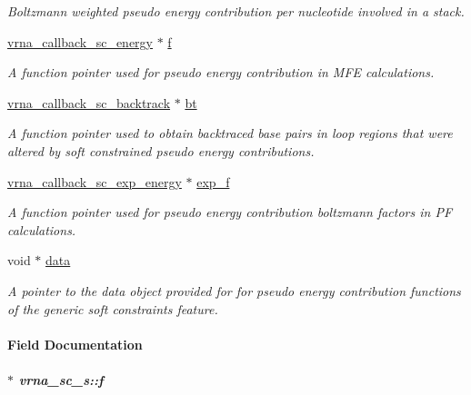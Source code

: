 \begin{DoxyCompactItemize}
\begin{DoxyCompactList}\small\item\em Boltzmann weighted pseudo energy contribution per nucleotide involved in a stack. \end{DoxyCompactList}\item 
\hyperlink{group__soft__constraints_gaf38062858ac25fd5e240c2c3b0b0b780}{vrna\+\_\+callback\+\_\+sc\+\_\+energy} $\ast$ \hyperlink{group__soft__constraints_a32dc86090237888c75491bbd4861a04b}{f}
\begin{DoxyCompactList}\small\item\em A function pointer used for pseudo energy contribution in M\+F\+E calculations. \end{DoxyCompactList}\item 
\hyperlink{group__soft__constraints_gaa216f513c3b0bd6fe5807dd0c53a8e5a}{vrna\+\_\+callback\+\_\+sc\+\_\+backtrack} $\ast$ \hyperlink{group__soft__constraints_a2a2aca01782c2b980d7b7fd05b9be89c}{bt}
\begin{DoxyCompactList}\small\item\em A function pointer used to obtain backtraced base pairs in loop regions that were altered by soft constrained pseudo energy contributions. \end{DoxyCompactList}\item 
\hyperlink{group__soft__constraints_ga2eade8745c163a553763be4cfe2a679b}{vrna\+\_\+callback\+\_\+sc\+\_\+exp\+\_\+energy} $\ast$ \hyperlink{group__soft__constraints_a0de08a09f3ccf2f97974d23192668ab0}{exp\+\_\+f}
\begin{DoxyCompactList}\small\item\em A function pointer used for pseudo energy contribution boltzmann factors in P\+F calculations. \end{DoxyCompactList}\item 
\hypertarget{group__soft__constraints_a7574680143df97b9029146c2150bf06d}{}void $\ast$ \hyperlink{group__soft__constraints_a7574680143df97b9029146c2150bf06d}{data}\label{group__soft__constraints_a7574680143df97b9029146c2150bf06d}

\begin{DoxyCompactList}\small\item\em A pointer to the data object provided for for pseudo energy contribution functions of the generic soft constraints feature. \end{DoxyCompactList}\end{DoxyCompactItemize}


\paragraph{Field Documentation}
\hypertarget{group__soft__constraints_a32dc86090237888c75491bbd4861a04b}{}
\subparagraph[{f}]{$\ast$ vrna\+\_\+sc\+\_\+s\+::f}\label{group__soft__constraints_a32dc86090237888c75491bbd4861a04b}


